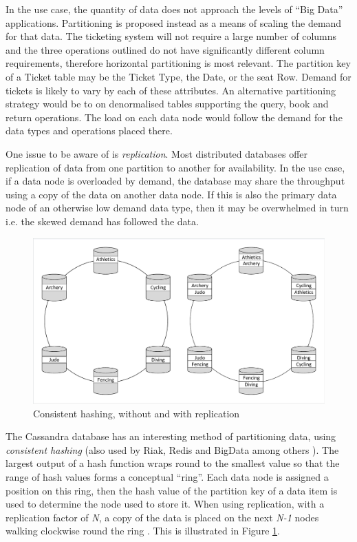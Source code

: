 In the use case, the quantity of data does not approach the levels of ``Big Data'' applications.  Partitioning is proposed instead as a means of scaling the demand for that data.  The ticketing system will not require a large number of columns and the three operations outlined do not have significantly different column requirements, therefore horizontal partitioning is most relevant.  The partition key of a Ticket table may be the Ticket Type, the Date, or the seat Row.  Demand for tickets is likely to vary by each of these attributes.  An alternative partitioning strategy would be to on denormalised tables supporting the query, book and return operations.  The load on each data node would follow the demand for the data types and operations placed there.

One issue to be aware of is {\itshape replication}.   Most distributed databases offer replication of data from one partition to another for availability.  In the use case, if a data node is overloaded by demand, the database may share the throughput using a copy of the data on another data node.  If this is also the primary data node of an otherwise low demand data type, then it may be overwhelmed in turn i.e. the skewed demand has followed the data.

\begin{figure}
	\caption{Consistent hashing, without and with replication}
	\label{figure:consistent_hashing}
	\centering
	\includegraphics[trim = 5 5 5 5, clip, width=\textwidth]{img/dbdist}
\end{figure}
\FloatBarrier
The Cassandra database has an interesting method of partitioning data, using {\itshape consistent hashing} (also used by Riak, Redis and BigData among others \cite{RN66}).  The largest output of a hash function wraps round to the smallest value so that the range of hash values forms a conceptual ``ring''.  Each data node is assigned a position on this ring, then the hash value of the partition key of a data item is used to determine the node used to store it.  When using replication, with a replication factor of {\itshape N}, a copy of the data is placed on the next {\itshape N-1} nodes walking clockwise round the ring \cite{RN1050}.  This is illustrated in Figure \ref{figure:consistent_hashing}.


